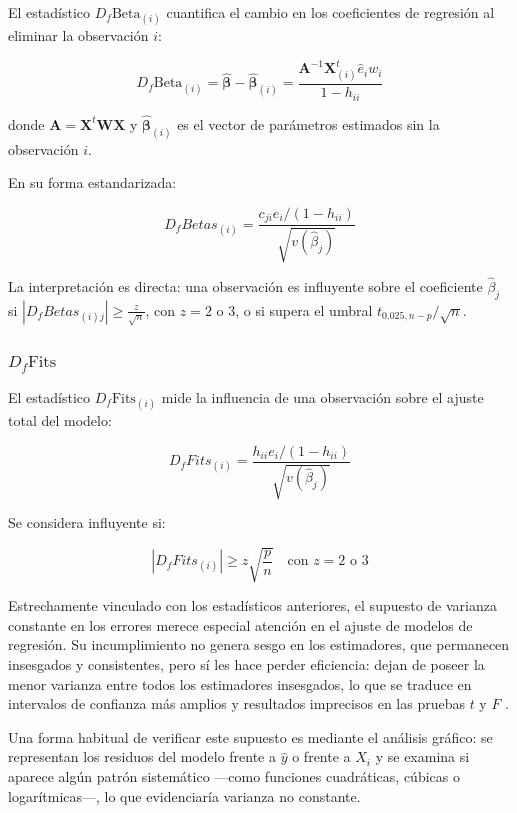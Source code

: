 \documentclass[
  spanish,
  12pt,
]{book}
\begin{document}
El estadístico \(D_f \text{Beta}_{(i)}\) cuantifica el cambio en los coeficientes de regresión al eliminar la observación \(i\):

\[
D_f \text{Beta}_{(i)} = \hat{\boldsymbol{\beta}}-\hat{\boldsymbol{\beta}}_{\left(i\right)}=\frac{\boldsymbol{A}^{-1}\boldsymbol{X}_{\left(i\right)}^{t}\hat{e}_{i}w_{i}}{1-h_{ii}}
\]

donde \(\boldsymbol{A} =\boldsymbol{X}^{t}\boldsymbol{WX}\) y \(\hat{\boldsymbol{\beta}}_{(i)}\) es el vector de parámetros estimados sin la observación \(i\).

En su forma estandarizada:

\[
D_f Betas_{\left(i\right)}=\frac{{c_{ji}e_{i}}\big/{\left(1-h_{ii}\right)}}{\sqrt{v\left(\hat{\beta}_{j}\right)}}
\]

La interpretación es directa: una observación es influyente sobre el coeficiente \(\hat{\beta}_j\) si \(|D_f Betas_{(i)j}|\geq \frac{z}{\sqrt{n}}\), con \(z=2\) o \(3\), o si supera el umbral \(t_{0.025,n-p}/\sqrt{n}\).

\subsubsection{\texorpdfstring{\(D_f \text{Fits}\)}{D\_f \textbackslash text\{Fits\}}}\label{d_f-textfits}

El estadístico \(D_f \text{Fits}_{(i)}\) mide la influencia de una observación sobre el ajuste total del modelo:

\[
D_{f}Fits_{\left(i\right)}= \frac{h_{ii}e_{i}\big/\left(1-h_{ii}\right)}{\sqrt{v\left(\hat{\beta}_{j}\right)}}
\]

Se considera influyente si:

\[
|D_f Fits_{(i)}| \geq z\sqrt{\frac{p}{n}} \quad \text{con } z=2 \text{ o } 3
\]

Estrechamente vinculado con los estadísticos anteriores, el supuesto de varianza constante en los errores merece especial atención en el ajuste de modelos de regresión. Su incumplimiento no genera sesgo en los estimadores, que permanecen insesgados y consistentes, pero sí les hace perder eficiencia: dejan de poseer la menor varianza entre todos los estimadores insesgados, lo que se traduce en intervalos de confianza más amplios y resultados imprecisos en las pruebas \(t\) y \(F\) \citep{tellez2015estadistica}.

Una forma habitual de verificar este supuesto es mediante el análisis gráfico: se representan los residuos del modelo frente a \(\hat{y}\) o frente a \(X_{i}\) y se examina si aparece algún patrón sistemático ---como funciones cuadráticas, cúbicas o logarítmicas---, lo que evidenciaría varianza no constante.
\end{document}
